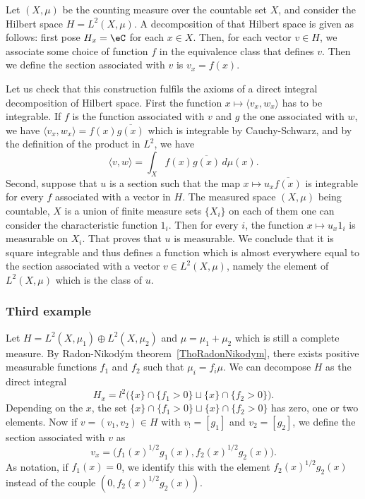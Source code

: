 Let $(X,\mu)$ be the counting measure over the countable set $X$, and consider the Hilbert space $H=L^2(X,\mu)$. A decomposition of that Hilbert space is given as follows: first pose $H_x=\eC$ for each $x\in X$. Then, for each vector $v\in H$, we associate some choice of function $f$ in the equivalence class that defines $v$. Then we define the section associated with $v$ is $v_x=f(x)$.

Let us check that this construction fulfils the axioms of a direct integral decomposition of Hilbert space. First the function $x\mapsto \langle v_x, w_x\rangle $ has to be integrable. If $f$ is the function associated with $v$ and $g$ the one associated with $w$, we have $\langle v_x, w_x\rangle =f(x)\overline{ g(x) }$ which is integrable by Cauchy-Schwarz, and by the definition of the product in $L^2$, we have
\begin{equation}
	\langle v, w\rangle =\int_X f(x)\overline{ g(x) }\,d\mu(x).
\end{equation}
Second, suppose that $u$ is a section such that the map $x\mapsto u_x\overline{ f(x) }$ is integrable for every $f$ associated with a vector in $H$. The measured space $(X,\mu)$ being countable, $X$ is a union of finite measure sets $\{ X_i \}$ on each of them one can consider the characteristic function $1_i$. Then for every $i$, the function $x\mapsto u_x 1_i$ is measurable on $X_i$. That proves that $u$ is measurable. We conclude that it is square integrable and thus defines a function which is almost everywhere equal to the section associated with a vector $v\in L^2(X,\mu)$, namely the element of $L^2(X,\mu)$ which is the class of $u$.

					\subsubsection{Third example}

Let $H=L^2(X,\mu_1)\oplus L^2(X,\mu_2)$ and $\mu=\mu_1+\mu_2$ which is still a complete measure. By Radon-Nikod\'ym theorem~\ref{ThoRadonNikodym}, there exists positive measurable functions $f_1$ and $f_2$ such that $\mu_i=f_i\mu$. We can decompose $H$ as the direct integral
\begin{equation}
	H_x=l^2\Big(    \{ x \}\cap\{ f_1>0 \}\sqcup \{ x \}\cap\{ f_2>0 \}  \Big).
\end{equation}
Depending on the $x$, the set $\{ x \}\cap\{ f_1>0 \}\sqcup \{ x \}\cap\{ f_2>0 \}$ has zero, one or two elements. Now if $v=(v_1,v_2)\in H$ with $v_!=[g_1]$ and $v_2=[g_2]$, we define the section associated with $v$ as
\begin{equation}
	v_x=\big( f_1(x)^{1/2}g_1(x),f_2(x)^{1/2}g_2(x) \big).
\end{equation}
As notation, if $f_1(x)=0$, we identify this with the element $f_2(x)^{1/2}g_2(x)$ instead of the couple $(0,f_2(x)^{1/2}g_2(x))$.

